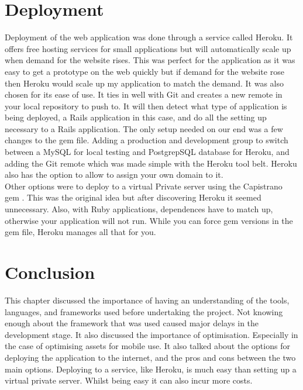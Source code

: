 \section{Deployment}
\label{sec:deployment}
Deployment of the web application was done through a service called Heroku. It offers free hosting services for small applications but will automatically scale up when demand for the website rises. This was perfect for the application as it was easy to get a prototype on the web quickly but if demand for the website rose then Heroku would scale up my application to match the demand. It was also chosen for its ease of use. It ties in well with Git and creates a new remote in your local repository to push to. It will then detect what type of application is being deployed, a Rails application in this case, and do all the setting up necessary to a Rails application. The only setup needed on our end was a few changes to the gem file. Adding a production and development group to switch between a MySQL \citep{mysql:1995} for local testing and PostgrepSQL \citep{postgres:1995} database for Heroku, and adding the Git remote which was made simple with the Heroku tool belt. Heroku also has the option to allow to assign your own domain to it.\\

Other options were to deploy to a virtual Private server using the Capistrano gem \citep{capistrano:2013}. This was the original idea but after discovering Heroku it seemed unnecessary. Also, with Ruby applications, dependences have to match up, otherwise your application will not run. While you can force gem versions in the gem file, Heroku manages all that for you.

\section{Conclusion}
This chapter discussed the importance of having an understanding of the tools, languages, and frameworks used before undertaking the project. Not knowing enough about the framework that was used caused major delays in the development stage. It also discussed the importance of optimisation. Especially in the case of optimising assets for mobile use. It also talked about the options for deploying the application to the internet, and the pros and cons between the two main options. Deploying to a service, like Heroku, is much easy than setting up a virtual private server. Whilst being easy it can also incur more costs.